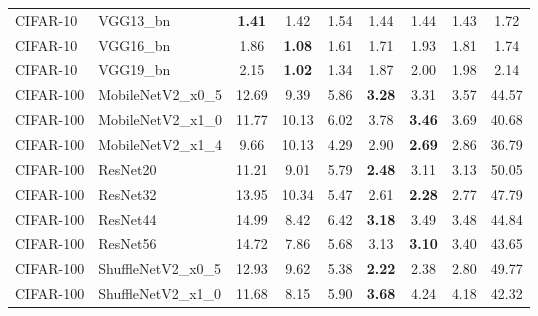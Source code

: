 \begin{table}[h!]
{\begin{tabular}{llccccccc}
 CIFAR-10 &          VGG13\_bn & \textbf{1.41} &                  1.42 &                  1.54 &                  1.44 &                  1.44 &                  1.43 &        1.72 \\
 CIFAR-10 &          VGG16\_bn &                  1.86 & \textbf{1.08} &                  1.61 &                  1.71 &                  1.93 &                  1.81 &        1.74 \\
 CIFAR-10 &          VGG19\_bn &                  2.15 & \textbf{1.02} &                  1.34 &                  1.87 &                  2.00 &                  1.98 &        2.14 \\
CIFAR-100 &  MobileNetV2\_x0\_5 &                 12.69 &                  9.39 &                  5.86 & \textbf{3.28} &                  3.31 &                  3.57 &       44.57 \\
CIFAR-100 &  MobileNetV2\_x1\_0 &                 11.77 &                 10.13 &                  6.02 &                  3.78 & \textbf{3.46} &                  3.69 &       40.68 \\
CIFAR-100 &  MobileNetV2\_x1\_4 &                  9.66 &                 10.13 &                  4.29 &                  2.90 & \textbf{2.69} &                  2.86 &       36.79 \\
CIFAR-100 &          ResNet20 &                 11.21 &                  9.01 &                  5.79 & \textbf{2.48} &                  3.11 &                  3.13 &       50.05 \\
CIFAR-100 &          ResNet32 &                 13.95 &                 10.34 &                  5.47 &                  2.61 & \textbf{2.28} &                  2.77 &       47.79 \\
CIFAR-100 &          ResNet44 &                 14.99 &                  8.42 &                  6.42 & \textbf{3.18} &                  3.49 &                  3.48 &       44.84 \\
CIFAR-100 &          ResNet56 &                 14.72 &                  7.86 &                  5.68 &                  3.13 & \textbf{3.10} &                  3.40 &       43.65 \\
CIFAR-100 & ShuffleNetV2\_x0\_5 &                 12.93 &                  9.62 &                  5.38 & \textbf{2.22} &                  2.38 &                  2.80 &       49.77 \\
CIFAR-100 & ShuffleNetV2\_x1\_0 &                 11.68 &                  8.15 &                  5.90 & \textbf{3.68} &                  4.24 &                  4.18 &       42.32 \\

\end{tabular}}
\end{table}
